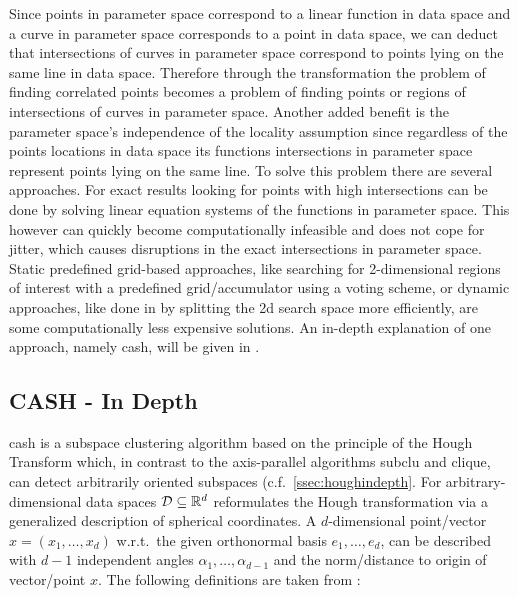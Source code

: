 Since points in parameter space correspond to a linear function in data space and a curve in parameter space corresponds to a point in data space, we can deduct that intersections of curves in parameter space correspond to points lying on the same line in data space. Therefore through the transformation the problem of finding correlated points becomes a problem of finding points or regions of intersections of curves in parameter space. Another added benefit is the parameter space's independence of the locality assumption since regardless of the points locations in data space its functions intersections in parameter space represent points lying on the same line.  To solve this problem there are several approaches. For exact results looking for points with high intersections can be done by solving linear equation systems of the functions in parameter space. This however can quickly become computationally infeasible and does not cope for jitter, which causes disruptions in the exact intersections in parameter space. Static predefined grid-based approaches, like searching for 2-dimensional regions of interest with a predefined grid/accumulator using a voting scheme, or dynamic approaches, like done in \textcite{CASHachtert2008global} by splitting the 2d search space more efficiently, are some computationally less expensive solutions. An in-depth explanation of one approach, namely \acrfull{cash}, will be given in .

\subsection{CASH - In Depth}\label{ssec:CASHindepth}
\acrfull{cash} is a subspace clustering algorithm based on the principle of the Hough Transform which, in contrast to the axis-parallel algorithms \gls{subclu}\cite{sublcukailing2004density} and \gls{clique}\cite{cliqueagrawal1998automatic}, can detect arbitrarily oriented subspaces (c.f.~\autoref{ssec:houghindepth}. 
For arbitrary-dimensional data spaces $\mathcal{D} \subseteq \mathbb{R}^d$ \textcite{CASHachtert2008robust} reformulates the Hough transformation via a generalized description of spherical coordinates. A $d$-dimensional point/vector $x=(x_1,\dotsc,x_d)$ w.r.t.\ the given orthonormal basis $e_1,\dotsc,e_d$, can be described with $d-1$ independent angles $\alpha_1,\dotsc,\alpha_{d-1}$ and the norm/distance to origin of vector/point $x$. The following definitions are taken from \cite{CASHachtert2008robust}:

